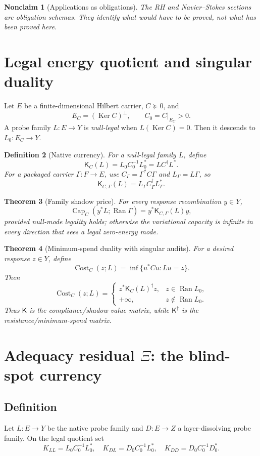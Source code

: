\documentclass[11pt]{article}
\newtheorem{theorem}{Theorem}[section]
\newtheorem{definition}[theorem]{Definition}
\newtheorem{nonclaim}[theorem]{Nonclaim}
\DeclareMathOperator{\Ran}{Ran}
\DeclareMathOperator{\Ker}{Ker}
\DeclareMathOperator{\Cost}{Cost}
\newcommand{\K}{\mathsf K}
\begin{document}
\begin{nonclaim}[Applications as obligations]
The RH and Navier--Stokes sections are obligation schemas.  They identify what would have to be proved, not what has been proved here.
\end{nonclaim}

\section{Legal energy quotient and singular duality}
Let \(E\) be a finite-dimensional Hilbert carrier, \(C\succeq0\), and
\[
  E_C=(\Ker C)^\perp,\qquad C_0=C|_{E_C}>0.
\]
A probe family \(L:E\to Y\) is \emph{null-legal} when \(L(\Ker C)=0\).  Then it descends to \(L_0:E_C\to Y\).

\begin{definition}[Native currency]
For a null-legal family \(L\), define
\[
  \K_C(L)=L_0C_0^{-1}L_0^*=LC^\dagger L^*.
\]
For a packaged carrier \(\Gamma:F\to E\), use \(C_\Gamma=\Gamma^*C\Gamma\) and \(L_\Gamma=L\Gamma\), so
\[
  \K_{C,\Gamma}(L)=L_\Gamma C_\Gamma^\dagger L_\Gamma^*.
\]
\end{definition}

\begin{theorem}[Family shadow price]
For every response recombination \(y\in Y\),
\[
  \operatorname{Cap}_C(y^*L;\Ran\Gamma)
  =y^*\K_{C,\Gamma}(L)y,
\]
provided null-mode legality holds; otherwise the variational capacity is infinite in every direction that sees a legal zero-energy mode.
\end{theorem}

\begin{theorem}[Minimum-spend duality with singular audits]
For a desired response \(z\in Y\), define
\[
  \Cost_C(z;L)=\inf\{u^*Cu: Lu=z\}.
\]
Then
\[
  \Cost_C(z;L)=
  \begin{cases}
  z^*\K_C(L)^\dagger z,& z\in\Ran L_0,\\
  +\infty,& z\notin\Ran L_0.
  \end{cases}
\]
Thus \(\K\) is the compliance/shadow-value matrix, while \(\K^\dagger\) is the resistance/minimum-spend matrix.
\end{theorem}

\section{Adequacy residual \texorpdfstring{\(\Xi\)}{Xi}: the blind-spot currency}

\subsection{Definition}
Let \(L:E\to Y\) be the native probe family and \(D:E\to Z\) a layer-dissolving probe family.  On the legal quotient set
\[
K_{LL}=L_0C_0^{-1}L_0^*,\quad
K_{DL}=D_0C_0^{-1}L_0^*,\quad
K_{DD}=D_0C_0^{-1}D_0^*.
\]
\end{document}
